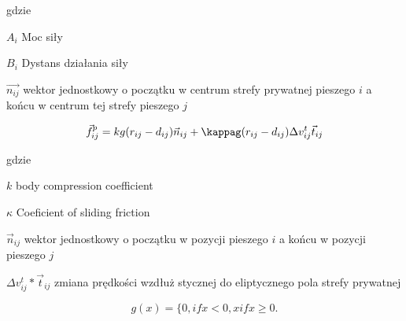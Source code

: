 gdzie
\begin{eqwhere}[2cm]
	\item[$A_{i}$] Moc siły
	\item[$B_{i}$] Dystans działania siły
	\item[$\vec{n_{ij}}$] wektor jednostkowy o początku w centrum strefy prywatnej pieszego $i$ a końcu w centrum tej strefy pieszego $j$
\end{eqwhere}

\begin{equation}
\vec{f}_{ij}^{p} = kg(r_{ij} - d_{ij}) \vec{n}_{ij} + \kappag (r_{ij} - d_{ij}) \Delta v _{ij}^{t} \vec{t}_{ij}
\end{equation}

gdzie
\begin{eqwhere}[2cm]
	\item[$k$] body compression coefficient
	\item[$\kappa$] Coeficient of sliding friction
	\item[$\vec{n}_{ij}$] wektor jednostkowy o początku w pozycji pieszego $i$ a końcu w pozycji pieszego $j$
	\item[$\Delta v_{ij}^{t} * \vec{t}_{ij}$] zmiana prędkości wzdłuż stycznej do eliptycznego pola strefy prywatnej
\end{eqwhere}

\begin{equation}
g(x) = \lbrace {0, if x < 0, x if x \geq 0.}
\end{equation}
